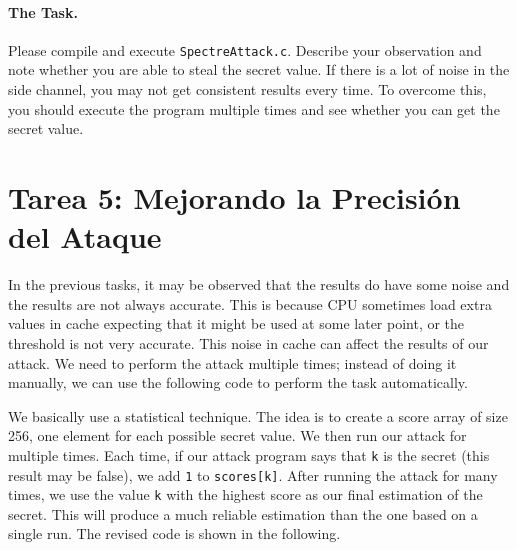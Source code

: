 \paragraph{The Task.} Please compile and execute 
\texttt{SpectreAttack.c}. Describe your observation and note whether you are able to steal the
secret value. If there is a lot of noise in the side channel, you may not get consistent results 
every time. To overcome this,
you should execute the program multiple times and see whether you can get the secret value. 




\section{Tarea 5: Mejorando la Precisión del Ataque}


In the previous tasks, it may be observed that the results do have some noise and the results
are not always accurate. This is because CPU sometimes load extra values in cache expecting
that it might be used at some later point, or the threshold is not very accurate. 
This noise in cache can affect the results of our
attack. We need to perform the attack multiple times; instead of doing it manually,
we can use the following code to perform the task automatically.

We basically use a statistical technique.
The idea is to create a score array of size 256, one element for each possible
secret value. We then run our attack for multiple times. Each time, if our
attack program says that \texttt{k} is the secret (this result may be
false), we add \texttt{1} to \texttt{scores[k]}.  After running the attack for many
times, we use the value \texttt{k} with
the highest score as our final estimation of the secret.  This will produce
a much reliable estimation than the one based on a single run. The revised
code is shown in the following.




